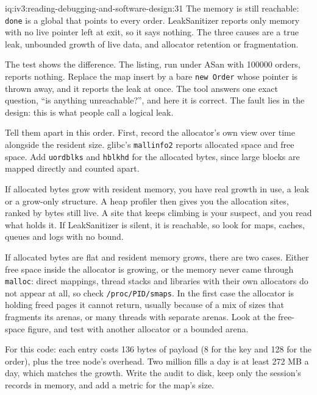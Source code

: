 \begin{solution}{iq:iv3:reading-debugging-and-software-design:31}
The memory is still reachable: \texttt{done} is a global that points to every order. LeakSanitizer reports only memory with no live pointer left at exit, so it says nothing. The three causes are a true leak, unbounded growth of live data, and allocator retention or fragmentation.

The test shows the difference. The listing, run under ASan with 100000 orders, reports nothing. Replace the map insert by a bare \texttt{new Order} whose pointer is thrown away, and it reports the leak at once. The tool answers one exact question, ``is anything unreachable?'', and here it is correct. The fault lies in the design: this is what people call a logical leak.

Tell them apart in this order. First, record the allocator's own view over time alongside the resident size. glibc's \texttt{mallinfo2} reports allocated space and free space. Add \texttt{uordblks} and \texttt{hblkhd} for the allocated bytes, since large blocks are mapped directly and counted apart.

If allocated bytes grow with resident memory, you have real growth in use, a leak or a grow-only structure. A heap profiler then gives you the allocation sites, ranked by bytes still live. A site that keeps climbing is your suspect, and you read what holds it. If LeakSanitizer is silent, it is reachable, so look for maps, caches, queues and logs with no bound.

If allocated bytes are flat and resident memory grows, there are two cases. Either free space inside the allocator is growing, or the memory never came through \texttt{malloc}: direct mappings, thread stacks and libraries with their own allocators do not appear at all, so check \texttt{/proc/PID/smaps}. In the first case the allocator is holding freed pages it cannot return, usually because of a mix of sizes that fragments its arenas, or many threads with separate arenas. Look at the free-space figure, and test with another allocator or a bounded arena.

For this code: each entry costs 136 bytes of payload (8 for the key and 128 for the order), plus the tree node's overhead. Two million fills a day is at least 272 MB a day, which matches the growth. Write the audit to disk, keep only the session's records in memory, and add a metric for the map's size.


\end{solution}

